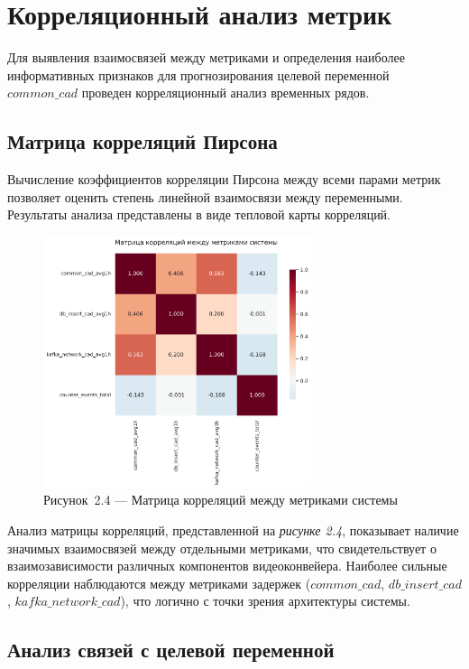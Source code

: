 \section{Корреляционный анализ метрик}

Для выявления взаимосвязей между метриками и определения наиболее информативных признаков для прогнозирования целевой переменной $common\_cad$ проведен корреляционный анализ временных рядов.

\subsection{Матрица корреляций Пирсона}

Вычисление коэффициентов корреляции Пирсона между всеми парами метрик позволяет оценить степень линейной взаимосвязи между переменными. Результаты анализа представлены в виде тепловой карты корреляций.

\begin{figure}[H]
	\centering
	\includegraphics[width=0.7\textwidth]{figures/chapter2/correlation_matrix_heatmap.png}
	\caption*{Рисунок~2.4 --- Матрица корреляций между метриками системы}
	\label{fig:correlation_matrix}
\end{figure}

Анализ матрицы корреляций, представленной на \textit{рисунке 2.4}, показывает наличие значимых взаимосвязей между отдельными метриками, что свидетельствует о взаимозависимости различных компонентов видеоконвейера. Наиболее сильные корреляции наблюдаются между метриками задержек ($common\_cad$, $db\_insert\_cad$, $kafka\_network\_cad$), что логично с точки зрения архитектуры системы.

\subsection{Анализ связей с целевой переменной}


